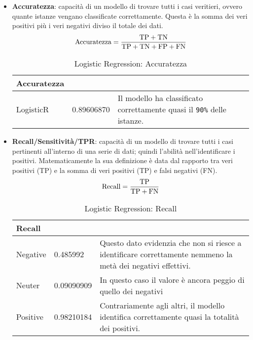 \begin{itemize}
				\item \textbf{Accuratezza}: capacità di un modello di trovare tutti i casi veritieri, ovvero quante istanze vengano classificate correttamente. Questa è la somma dei veri positivi più i veri negativi diviso il totale dei dati.
					\begin{equation}
					\text{Accuratezza} = \frac{\text{TP} + \text{TN}}{\text{TP} + \text{TN} + \text{FP} + \text{FN}} \\
					\end{equation}
					
					\begin{table} [H]
						\caption{Logistic Regression: Accuratezza}
						\label{tab:accLogisticRegression}
						\centering
						\begin{tabular}{llp{}}
							\toprule 
							\textbf{Accuratezza}	\\
							\midrule
							LogisticR & 0.89606870 & Il modello ha classificato correttamente quasi il \verb|90%| delle istanze.\\
							\bottomrule
						\end{tabular}
					\end{table}
				
				\item \textbf{Recall/Sensitività/TPR}: capacità di un modello di trovare tutti i casi pertinenti all’interno di una serie di dati; quindi l'abilità nell'identificare i positivi. Matematicamente la sua definizione è data dal rapporto tra veri positivi (TP) e la somma di veri positivi (TP) e falsi negativi (FN).
					\begin{equation}
					\text{Recall} = \frac{\text{TP}}{\text{TP} + \text{FN}} \\
					\end{equation}
					
					\begin{table} [H]
						\caption{Logistic Regression: Recall}
						\label{tab:RecallLogisticRegression}
						\centering
						\begin{tabular}{llp{}}
							\toprule 
							\textbf{Recall}	\\
							\midrule
							Negative  & 0.485992  & Questo dato evidenzia che non si riesce a identificare correttamente nemmeno la metà dei negativi effettivi.\\
							Neuter & 0.09090909 & In questo caso il valore è ancora peggio di quello dei negativi\\
							Positive & 0.98210184 & Contrariamente agli altri, il modello identifica correttamente quasi la totalità dei positivi.\\
							\bottomrule
						\end{tabular}
					\end{table}
				

\end{itemize}
